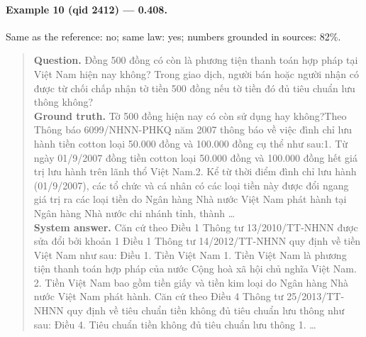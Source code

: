 \paragraph{Example 10 (qid 2412) --- \rl{} 0.408.} Same \dieu{} as the reference: no; same law: yes; numbers grounded in sources: 82\%.
\begin{quote}\small\textbf{Question.} Đồng 500 đồng có còn là phương tiện thanh toán hợp pháp tại Việt Nam hiện nay không? Trong giao dịch, người bán hoặc người nhận có được từ chối chấp nhận tờ tiền 500 đồng nếu tờ tiền đó đủ tiêu chuẩn lưu thông không?\\[2pt]
\textbf{Ground truth.} Tờ 500 đồng hiện nay có còn sử dụng hay không?Theo Thông báo 6099/NHNN-PHKQ năm 2007 thông báo về việc đình chỉ lưu hành tiền cotton loại 50.000 đồng và 100.000 đồng cụ thể như sau:1. Từ ngày 01/9/2007 đồng tiền cotton loại 50.000 đồng và 100.000 đồng hết giá trị lưu hành trên lãnh thổ Việt Nam.2. Kể từ thời điểm đình chỉ lưu hành (01/9/2007), các tổ chức và cá nhân có các loại tiền này được đổi ngang giá trị ra các loại tiền do Ngân hàng Nhà nước Việt Nam phát hành tại Ngân hàng Nhà nước chi nhánh tỉnh, thành …\\[2pt]
\textbf{System answer.} Căn cứ theo Điều 1 Thông tư 13/2010/TT-NHNN được sửa đổi bởi khoản 1 Điều 1 Thông tư 14/2012/TT-NHNN quy định về tiền Việt Nam như sau: Điều 1. Tiền Việt Nam 1. Tiền Việt Nam là phương tiện thanh toán hợp pháp của nước Cộng hoà xã hội chủ nghĩa Việt Nam. 2. Tiền Việt Nam bao gồm tiền giấy và tiền kim loại do Ngân hàng Nhà nước Việt Nam phát hành. Căn cứ theo Điều 4 Thông tư 25/2013/TT-NHNN quy định về tiêu chuẩn tiền không đủ tiêu chuẩn lưu thông như sau: Điều 4. Tiêu chuẩn tiền không đủ tiêu chuẩn lưu thông 1. …\end{quote}

